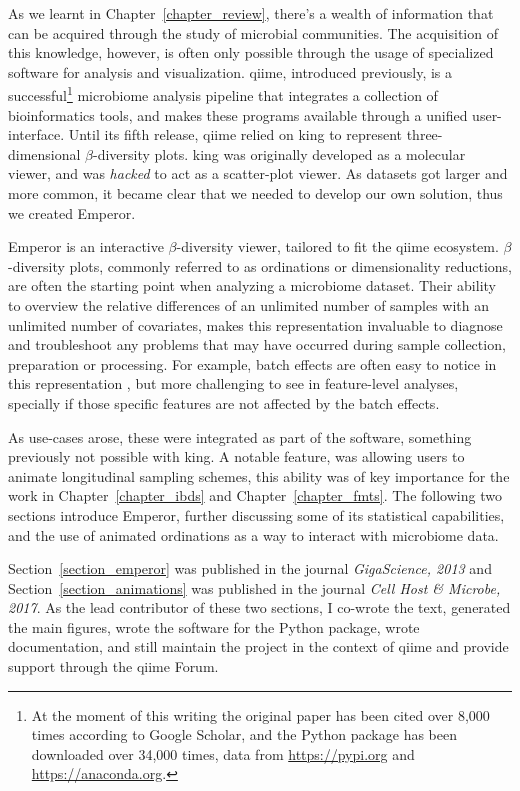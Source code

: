 \documentclass[12pt,chapterheads]{ucsd}
\begin{document}
As we learnt in Chapter~\ref{chapter_review}, there's a wealth of information 
that can be acquired through the study of microbial communities. The 
acquisition of this knowledge, however, is often only possible through the 
usage of specialized software for analysis and visualization. \gls{qiime}, 
introduced previously, is a successful\footnote{At the moment of this writing 
the original paper has been cited over 8,000 times according to Google Scholar, 
and the Python package has been downloaded over 34,000 times, data from 
\url{https://pypi.org} and \url{https://anaconda.org}.} microbiome analysis 
pipeline that integrates a collection of bioinformatics tools, and makes these 
programs available through a unified user-interface. Until its fifth release, 
\gls{qiime} relied on \gls{king} to represent three-dimensional 
$\beta$-diversity plots. \gls{king} was originally developed as a molecular 
viewer, and was \textit{hacked} to act as a scatter-plot viewer. As datasets 
got larger and more common, it became clear that we needed to develop our own 
solution, thus we created Emperor.

Emperor is an interactive $\beta$-diversity viewer, tailored to fit the 
\gls{qiime} ecosystem. $\beta$-diversity plots, commonly referred to as 
ordinations or dimensionality reductions, are often the starting point when 
analyzing a microbiome dataset. Their ability to overview the relative 
differences of an unlimited number of samples with an unlimited number of 
covariates, makes this representation invaluable to diagnose and troubleshoot 
any problems that may have occurred during sample collection, preparation or 
processing. For example, batch effects are often easy to notice in this 
representation \cite{Gibbons165910}, but more challenging to see in 
feature-level analyses, specially if those specific features are 
not affected by the batch effects.

As use-cases arose, these were integrated as part of the software, something 
previously not possible with \gls{king}. A notable feature, was allowing users 
to animate longitudinal sampling schemes, this ability was of key importance 
for the work in Chapter~\ref{chapter_ibds} and Chapter~\ref{chapter_fmts}. The 
following two sections introduce Emperor, further discussing some of its 
statistical capabilities, and the use of animated ordinations as a way to 
interact with microbiome data.

Section~\ref{section_emperor} was published in the journal \textsl{GigaScience, 
2013} and Section~\ref{section_animations} was published in the journal 
\textsl{Cell Host \& Microbe, 2017}. As the lead contributor of these two 
sections, I co-wrote the text, generated the main figures, wrote the software 
for the Python package, wrote documentation, and still maintain the project in 
the context of \gls{qiime} and provide support through the \gls{qiime} Forum.
\end{document}
